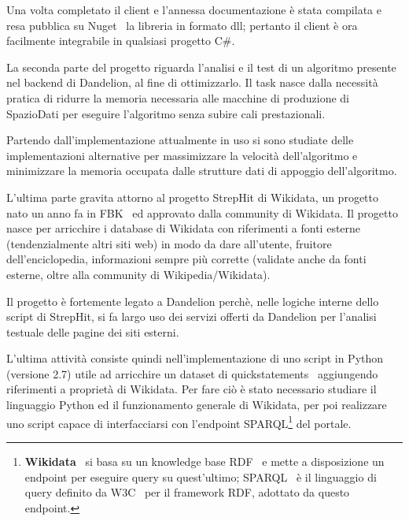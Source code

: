 Una volta completato il client e l'annessa documentazione è stata compilata e resa pubblica su Nuget~\cite{nuget} la libreria in formato dll; 
pertanto il client è ora facilmente integrabile in qualsiasi progetto C$\#$.

La seconda parte del progetto riguarda l'analisi e il test di un algoritmo presente nel backend di Dandelion, al fine di ottimizzarlo. 
Il task nasce dalla necessità pratica di ridurre la memoria necessaria alle macchine di produzione di SpazioDati per eseguire l'algoritmo senza subire cali prestazionali.

Partendo dall'implementazione attualmente in uso si sono studiate delle implementazioni alternative per massimizzare la velocità dell'algoritmo e minimizzare 
la memoria occupata dalle strutture dati di appoggio dell'algoritmo. 

L'ultima parte gravita attorno al progetto StrepHit di Wikidata, un progetto nato un anno fa in FBK~\cite{fbk} ed approvato dalla community di Wikidata. 
Il progetto nasce per arricchire i database di Wikidata con riferimenti a fonti esterne (tendenzialmente altri siti web) in modo da dare all'utente, fruitore dell'enciclopedia, 
informazioni sempre più corrette (validate anche da fonti esterne, oltre alla community di Wikipedia/Wikidata).

Il progetto è fortemente legato a Dandelion perchè, nelle logiche interne dello script di StrepHit, si fa largo uso dei servizi offerti da Dandelion per l'analisi testuale 
delle pagine dei siti esterni.

L'ultima attività consiste quindi nell'implementazione di uno script in Python (versione 2.7) utile ad arricchire un dataset di quickstatements~\cite{quickstatements} aggiungendo riferimenti a proprietà di Wikidata.
Per fare ciò è stato necessario studiare il linguaggio Python ed il funzionamento generale di Wikidata, per poi realizzare uno script capace di interfacciarsi con l'endpoint SPARQL\footnote{
    \textbf{Wikidata}~\cite{wikidata} si basa su un knowledge base RDF~\cite{rdf} e mette a disposizione un endpoint per eseguire query su quest'ultimo; 
    SPARQL~\cite{sparql-query} è il linguaggio di query definito da W3C~\cite{w3c} per il framework RDF, adottato da questo endpoint.
} del portale.
